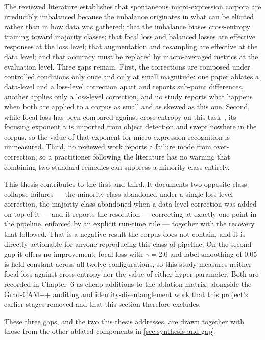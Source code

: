The reviewed literature establishes that spontaneous micro-expression corpora are irreducibly imbalanced because the imbalance originates in what can be elicited rather than in how data was gathered; that the imbalance biases cross-entropy training toward majority classes; that focal loss and balanced losses are effective responses at the loss level; that augmentation and resampling are effective at the data level; and that accuracy must be replaced by macro-averaged metrics at the evaluation level. Three gaps remain. First, the corrections are composed under controlled conditions only once and only at small magnitude: one paper ablates a data-level and a loss-level correction apart and reports sub-point differences, another applies only a loss-level correction, and no study reports what happens when both are applied to a corpus as small and as skewed as this one. Second, while focal loss has been compared against cross-entropy on this task~\cite{zhaoS2021}, its focusing exponent $\gamma$ is imported from object detection and swept nowhere in the corpus, so the value of that exponent for micro-expression recognition is unmeasured. Third, no reviewed work reports a failure mode from over-correction, so a practitioner following the literature has no warning that combining two standard remedies can suppress a minority class entirely.

This thesis contributes to the first and third. It documents two opposite class-collapse failures --- the minority class abandoned under a single loss-level correction, the majority class abandoned when a data-level correction was added on top of it --- and it reports the resolution --- correcting at exactly one point in the pipeline, enforced by an explicit run-time rule --- together with the recovery that followed. That is a negative result the corpus does not contain, and it is directly actionable for anyone reproducing this class of pipeline. On the second gap it offers no improvement: focal loss with $\gamma = 2.0$ and label smoothing of 0.05 is held constant across all twelve configurations, so this study measures neither focal loss against cross-entropy nor the value of either hyper-parameter. Both are recorded in Chapter~6 as cheap additions to the ablation matrix, alongside the Grad-CAM++ auditing and identity-disentanglement work that this project's earlier stages removed and that this section therefore excludes.

These three gaps, and the two this thesis addresses, are drawn together with those from the other ablated components in \autoref{sec:synthesis-and-gap}.


